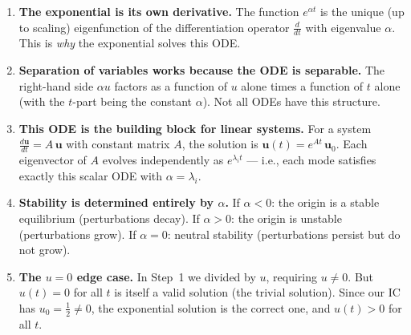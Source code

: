 \documentclass[11pt]{article}
\begin{document}
\begin{enumerate}
  \item \textbf{The exponential is its own derivative.}
    The function $e^{\alpha t}$ is the unique (up to scaling) eigenfunction of the
    differentiation operator $\frac{d}{dt}$ with eigenvalue $\alpha$.
    This is \emph{why} the exponential solves this ODE.

  \item \textbf{Separation of variables works because the ODE is separable.}
    The right-hand side $\alpha u$ factors as a function of $u$ alone times a
    function of $t$ alone (with the $t$-part being the constant $\alpha$).
    Not all ODEs have this structure.

  \item \textbf{This ODE is the building block for linear systems.}
    For a system $\frac{d\mathbf{u}}{dt} = A\,\mathbf{u}$ with constant matrix $A$,
    the solution is $\mathbf{u}(t) = e^{At}\,\mathbf{u}_0$. Each eigenvector of $A$
    evolves independently as $e^{\lambda_i t}$ --- i.e., each mode satisfies exactly
    this scalar ODE with $\alpha = \lambda_i$.

  \item \textbf{Stability is determined entirely by $\alpha$.}
    If $\alpha < 0$: the origin is a stable equilibrium (perturbations decay).
    If $\alpha > 0$: the origin is unstable (perturbations grow).
    If $\alpha = 0$: neutral stability (perturbations persist but do not grow).

  \item \textbf{The $u = 0$ edge case.}
    In Step~1 we divided by $u$, requiring $u \neq 0$.
    But $u(t) = 0$ for all $t$ is itself a valid solution (the trivial solution).
    Since our IC has $u_0 = \frac{1}{2} \neq 0$, the exponential solution is the
    correct one, and $u(t) > 0$ for all $t$.
\end{enumerate}
\end{document}
